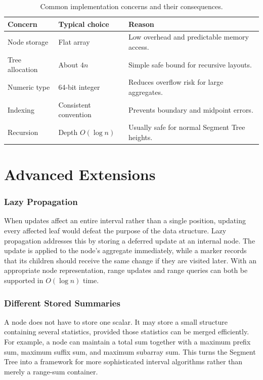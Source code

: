 \documentclass[11pt,open=any,headings=option]{scrreprt}
\begin{document}
\begin{table}[H]
\centering
\caption{Common implementation concerns and their consequences.}
\label{tab:implementation}
\begin{tabular}{p{4cm}p{3.1cm}p{5.2cm}}
\toprule
\textbf{Concern} & \textbf{Typical choice} & \textbf{Reason}\\
\midrule
Node storage & Flat array & Low overhead and predictable memory access.\\
Tree allocation & About $4n$ & Simple safe bound for recursive layouts.\\
Numeric type & 64-bit integer & Reduces overflow risk for large aggregates.\\
Indexing & Consistent convention & Prevents boundary and midpoint errors.\\
Recursion & Depth $O(\log n)$ & Usually safe for normal Segment Tree heights.\\
\bottomrule
\end{tabular}
\end{table}

\chapter{Advanced Extensions}

\subsection{Lazy Propagation}
When updates affect an entire interval rather than a single position, updating every affected leaf would defeat the purpose of the data structure. Lazy propagation addresses this by storing a deferred update at an internal node. The update is applied to the node's aggregate immediately, while a marker records that its children should receive the same change if they are visited later. With an appropriate node representation, range updates and range queries can both be supported in $O(\log n)$ time.

\subsection{Different Stored Summaries}
A node does not have to store one scalar. It may store a small structure containing several statistics, provided those statistics can be merged efficiently. For example, a node can maintain a total sum together with a maximum prefix sum, maximum suffix sum, and maximum subarray sum. This turns the Segment Tree into a framework for more sophisticated interval algorithms rather than merely a range-sum container.
\end{document}

